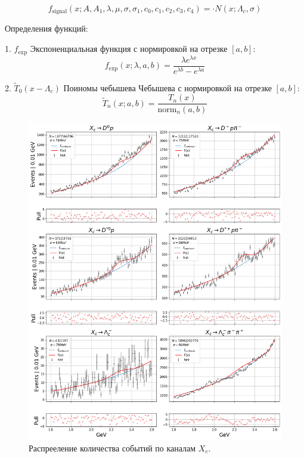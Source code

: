 \begin{equation}
f_{\text{signal}}(x; A, A_1, \lambda, \mu, \sigma, \sigma_1, c_0, c_1, c_2, c_3, c_4) = \cdot {N}(x; \Lambda_c, \sigma) 
\end{equation}

Определения функций:

1. $f_{\text{exp}}$ Экспоненциальная функция с нормировкой на отрезке $[a, b]$:
\begin{equation}
f_{\text{exp}}(x; \lambda, a, b) = \frac{\lambda e^{\lambda x}}{e^{\lambda b} - e^{\lambda a}}
\end{equation}

2. $\tilde T_0(x - \Lambda_c)$ Поиномы чебышева Чебышева с нормировкой на отрезке $[a,b]$:
\begin{equation}
\tilde T_n(x; a, b) = \frac{T_n(x)}{\text{norm}_n(a, b)}
\end{equation}


\begin{figure}[H]
    \centering
    \includegraphics[width=1\linewidth]{img/all_chan_sv.png}
    \caption{Распрееление количества событий по каналам $X_c$.}
\end{figure}

